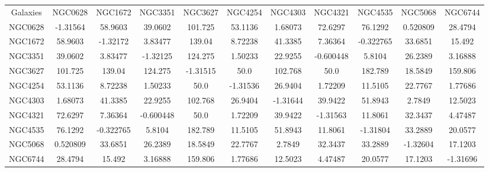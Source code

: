 \begin{table}
\begin{tabular}{ccccccccccc}
Galaxies & NGC0628 & NGC1672 & NGC3351 & NGC3627 & NGC4254 & NGC4303 & NGC4321 & NGC4535 & NGC5068 & NGC6744 \\
NGC0628 & -1.31564 & 58.9603 & 39.0602 & 101.725 & 53.1136 & 1.68073 & 72.6297 & 76.1292 & 0.520809 & 28.4794 \\
NGC1672 & 58.9603 & -1.32172 & 3.83477 & 139.04 & 8.72238 & 41.3385 & 7.36364 & -0.322765 & 33.6851 & 15.492 \\
NGC3351 & 39.0602 & 3.83477 & -1.32125 & 124.275 & 1.50233 & 22.9255 & -0.600448 & 5.8104 & 26.2389 & 3.16888 \\
NGC3627 & 101.725 & 139.04 & 124.275 & -1.31515 & 50.0 & 102.768 & 50.0 & 182.789 & 18.5849 & 159.806 \\
NGC4254 & 53.1136 & 8.72238 & 1.50233 & 50.0 & -1.31536 & 26.9404 & 1.72209 & 11.5105 & 22.7767 & 1.77686 \\
NGC4303 & 1.68073 & 41.3385 & 22.9255 & 102.768 & 26.9404 & -1.31644 & 39.9422 & 51.8943 & 2.7849 & 12.5023 \\
NGC4321 & 72.6297 & 7.36364 & -0.600448 & 50.0 & 1.72209 & 39.9422 & -1.31563 & 11.8061 & 32.3437 & 4.47487 \\
NGC4535 & 76.1292 & -0.322765 & 5.8104 & 182.789 & 11.5105 & 51.8943 & 11.8061 & -1.31804 & 33.2889 & 20.0577 \\
NGC5068 & 0.520809 & 33.6851 & 26.2389 & 18.5849 & 22.7767 & 2.7849 & 32.3437 & 33.2889 & -1.32604 & 17.1203 \\
NGC6744 & 28.4794 & 15.492 & 3.16888 & 159.806 & 1.77686 & 12.5023 & 4.47487 & 20.0577 & 17.1203 & -1.31696 \\
\end{tabular}
\end{table}
